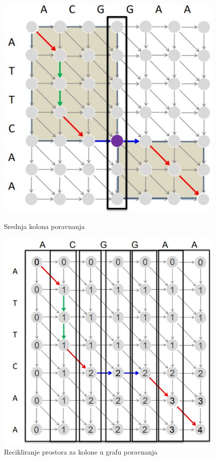 \begin{figure}[H]
	\begin{minipage}{0.45\textwidth}
		\includegraphics[width=\linewidth]{poglavlja/5/slike/podeliPaVladaj.JPG}
		\caption{Srednja kolona poravnanja}
		\label{slika:podeliPaVladaj}
	\end{minipage}
	\hfill
	\begin{minipage}{0.45\textwidth}
		\includegraphics[width=\linewidth]{poglavlja/5/slike/prostornaSlozenost2.JPG}
		\caption{Recikliranje prostora za kolone u grafu poravnanja}
		\label{slika:prostornaSlozenost}
	\end{minipage}
\end{figure}


